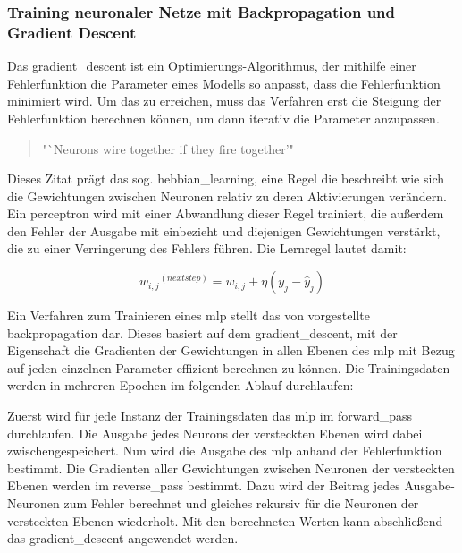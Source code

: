 \subsubsection{Training neuronaler Netze mit Backpropagation und Gradient Descent}
\label{chap:Training neuronaler Netze mit Backpropagation und Gradient Descent}

Das \gls{gradient_descent} ist ein Optimierungs-Algorithmus, der mithilfe einer Fehlerfunktion die Parameter eines Modells so anpasst, dass die Fehlerfunktion minimiert wird. Um das zu erreichen, muss das Verfahren erst die Steigung der Fehlerfunktion berechnen können, um dann iterativ die Parameter anzupassen. \cite[vgl. S. 118]{Geron2019}

\begin{quote}
  "`Neurons wire together if they fire together'" \cite{Lowel1992}
\end{quote}

Dieses Zitat prägt das sog. \gls{hebbian_learning}, eine Regel die beschreibt wie sich die Gewichtungen zwischen Neuronen relativ zu deren Aktivierungen verändern. Ein \gls{perceptron} wird mit einer Abwandlung dieser Regel trainiert, die außerdem den Fehler der Ausgabe mit einbezieht und diejenigen Gewichtungen verstärkt, die zu einer Verringerung des Fehlers führen. \cite[vgl. S. 289 ff.]{Geron2019} Die Lernregel lautet damit:

\[{w_{i,j}}^{(next step)}=w_{i,j}+\eta(y_j-\hat{y}_j)\]

Ein Verfahren zum Trainieren eines \gls{mlp} stellt das von \cite{Rumelhart1986} vorgestellte \gls{backpropagation} dar. Dieses basiert auf dem \gls{gradient_descent}, mit der Eigenschaft die Gradienten der Gewichtungen in allen Ebenen des \gls{mlp} mit Bezug auf jeden einzelnen Parameter effizient berechnen zu können. Die Trainingsdaten werden in mehreren Epochen im folgenden Ablauf durchlaufen:

Zuerst wird für jede Instanz der Trainingsdaten das \gls{mlp} im \gls{forward_pass} durchlaufen. Die Ausgabe jedes Neurons der versteckten Ebenen wird dabei zwischengespeichert. Nun wird die Ausgabe des \gls{mlp} anhand der Fehlerfunktion bestimmt. Die Gradienten aller Gewichtungen zwischen Neuronen der versteckten Ebenen werden im \gls{reverse_pass} bestimmt. Dazu wird der Beitrag jedes Ausgabe-Neuronen zum Fehler berechnet und gleiches rekursiv für die Neuronen der versteckten Ebenen wiederholt. Mit den berechneten Werten kann abschließend das \gls{gradient_descent} angewendet werden. \cite[S. 286]{Geron2019}
